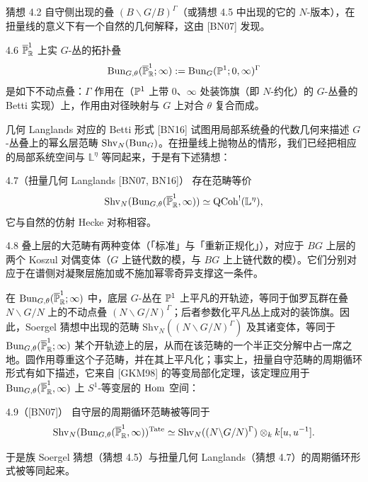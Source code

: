猜想 4.2 自守侧出现的叠 $(B\backslash G/B)^\Gamma$（或猜想 4.5 中出现的它的 $N$-版本），在扭量线的意义下有一个自然的几何解释，这由 [BN07] 发现。

\begin{defn}{4.6}\label{defn:a5-03-4-6}
$\overline{\mathbb{P}}^1_{\mathbb{R}}$ 上实 $G$-丛的拓扑叠
\[
\operatorname{Bun}_{G,\theta}(\overline{\mathbb{P}}^1_{\mathbb{R}};\infty):=\operatorname{Bun}_G(\mathbb{P}^1;0,\infty)^\Gamma
\]
是如下不动点叠：$\Gamma$ 作用在（$\mathbb{P}^1$ 上带 0、$\infty$ 处装饰旗（即 $N$-约化）的 $G$-丛叠的 Betti 实现）上，作用由对径映射与 $G$ 上对合 $\theta$ 复合而成。
\end{defn}

几何 Langlands 对应的 Betti 形式 [BN16] 试图用局部系统叠的代数几何来描述 $G$-丛叠上的幂幺层范畴 $\mathrm{Shv}_N(\operatorname{Bun}_G)$。在扭量线上抛物丛的情形，我们已经把相应的局部系统空间与 $\mathbb L^\eta$ 等同起来，于是有下述猜想：

\begin{conj}{4.7}（扭量几何 Langlands [BN07, BN16]）\label{conj:a5-03-4-7}
存在范畴等价
\[
\mathrm{Shv}_N(\operatorname{Bun}_{G,\theta}(\overline{\mathbb{P}}^1_{\mathbb{R}},\infty))\simeq \operatorname{QCoh}^{!}(\mathbb L^\eta),
\]
它与自然的仿射 Hecke 对称相容。
\end{conj}

\begin{rem}{4.8}\label{rem:a5-03-4-8}
叠上层的大范畴有两种变体（「标准」与「重新正规化」），对应于 $BG$ 上层的两个 Koszul 对偶变体（$G$ 上链代数的模，与 $BG$ 上上链代数的模）。它们分别对应于在谱侧对凝聚层施加或不施加幂零奇异支撑这一条件。
\end{rem}

在 $\operatorname{Bun}_{G,\theta}(\overline{\mathbb{P}}^1_{\mathbb{R}};\infty)$ 中，底层 $G$-丛在 $\mathbb{P}^1$ 上平凡的开轨迹，等同于伽罗瓦群在叠 $N\backslash G/N$ 上的不动点叠 $(N\backslash G/N)^\Gamma$；后者参数化平凡丛上成对的装饰旗。因此，Soergel 猜想中出现的范畴 $\mathrm{Shv}_N((N\backslash G/N)^\Gamma)$ 及其诸变体，等同于 $\operatorname{Bun}_{G,\theta}(\overline{\mathbb{P}}^1_{\mathbb{R}};\infty)$ 某个开轨迹上的层，从而在该范畴的一个半正交分解中占一席之地。圆作用尊重这个子范畴，并在其上平凡化；事实上，扭量自守范畴的周期循环形式有如下描述，它来自 [GKM98] 的等变局部化定理，该定理应用于 $\operatorname{Bun}_{G,\theta}(\overline{\mathbb{P}}^1_{\mathbb{R}},\infty)$ 上 $S^1$-等变层的 $\operatorname{Hom}$ 空间：

\begin{prop}{4.9}（[BN07]）\label{prop:a5-03-4-9}
自守层的周期循环范畴被等同于
\[
\mathrm{Shv}_N(\operatorname{Bun}_{G,\theta}(\overline{\mathbb{P}}^1_{\mathbb{R}},\infty))^{\mathrm{Tate}}\simeq \mathrm{Shv}_N((N\backslash G/N)^\Gamma)\otimes_k k[u,u^{-1}].
\]
\end{prop}

于是族 Soergel 猜想（猜想 4.5）与扭量几何 Langlands（猜想 4.7）的周期循环形式被等同起来。

